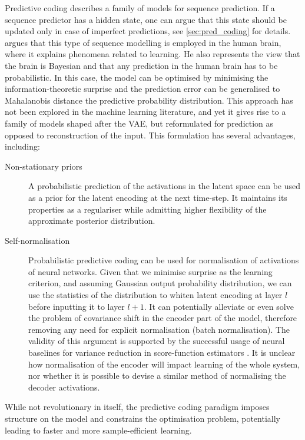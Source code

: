    Predictive coding describes a family of models for sequence prediction. If a sequence predictor has a hidden state, one can argue that this state should be updated only in case of imperfect predictions, see \cref{sec:pred_coding} for details. \cite{Friston2009guide} argues that this type of sequence modelling is employed in the human brain, where it explains phenomena related to learning. He also represents the view that the brain is Bayesian and that any prediction in the human brain has to be probabilistic. In this case, the model can be optimised by minimising the information-theoretic surprise and the prediction error can be generalised to Mahalanobis distance \wrt the predictive probability distribution. This approach has not been explored in the machine learning literature, and yet it gives rise to a family of models shaped after the VAE, but reformulated for prediction as opposed to reconstruction of the input. This formulation has several advantages, including:
    \begin{description}
        \item[Non-stationary priors] A probabilistic prediction of the activations in the latent space can be used as a prior for the latent encoding at the next time-step. It maintains its properties as a regulariser while admitting higher flexibility of the approximate posterior distribution.
        
        \item[Self-normalisation] Probabilistic predictive coding can be used for normalisation of activations of neural networks. Given that we minimise surprise as the learning criterion, and assuming Gaussian output probability distribution, we can use the statistics of the distribution to whiten latent encoding at layer $l$ before inputting it to layer $l+1$. It can potentially alleviate or even solve the problem of covariance shift in the encoder part of the model, therefore removing any need for explicit normalisation (\eg batch normalisation). The validity of this argument is supported by the successful usage of neural baselines for variance reduction in score-function estimators \citep{Mnih2014}. It is unclear how normalisation of the encoder will impact learning of the whole system, nor whether it is possible to devise a similar method of normalising the decoder activations.
    \end{description}
    While not revolutionary in itself, the predictive coding paradigm imposes structure on the model and constrains the optimisation problem, potentially leading to faster and more sample-efficient learning.

